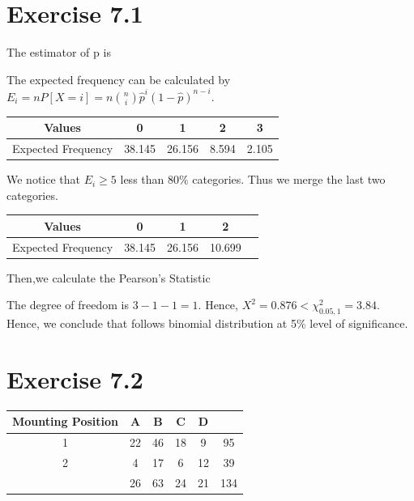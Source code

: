 \section*{Exercise 7.1}
The estimator of p is

The expected frequency can be calculated by $E_i=nP[X=i]=n\binom{n}{i}\hat{p}^i(1-\hat{p})^{n-i}$.
\begin{table}[H]
    \centering
    \begin{tabular}{ccccc}\hline
        Values & 0 & 1 & 2 & 3\\\hline
        Expected Frequency & 38.145 & 26.156 & 8.594 & 2.105\\\hline
    \end{tabular}
\end{table}

We notice that $E_i\geq5$ less than 80\% categories. Thus we merge the last two categories.
\begin{table}[H]
    \centering
    \begin{tabular}{ccccc}\hline
        Values & 0 & 1 & 2\\\hline
        Expected Frequency & 38.145 & 26.156 & 10.699\\\hline
    \end{tabular}
\end{table}

Then,we calculate the Pearson's Statistic

The degree of freedom is $3-1-1=1$. Hence, $X^2=0.876<\chi^2_{0.05,1}=3.84$. Hence, we conclude that follows binomial distribution at 5\% level of significance.

\section*{Exercise 7.2}
\begin{table}[h]
    \centering
    \begin{tabular}{c|cccc|c}
        Mounting Position & A & B & C & D & \\\hline
        1 & 22 & 46 & 18 & 9 & 95\\
        2 & 4 & 17 & 6 & 12 & 39\\\hline
        & 26 & 63 & 24 & 21 & 134\\
    \end{tabular}
\end{table}

